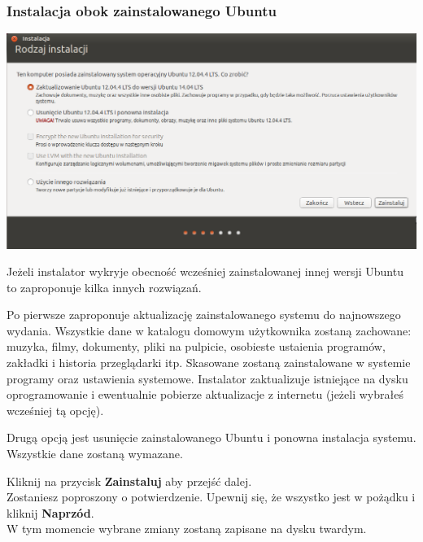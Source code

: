 \subsubsection{Instalacja obok zainstalowanego Ubuntu}
\begin{center}
	\includegraphics[scale=0.5]{images/instalator_partycjonowanie_obok_ubuntu.png}
\end{center}
Jeżeli instalator wykryje obecność wcześniej zainstalowanej innej wersji Ubuntu to zaproponuje kilka innych rozwiązań.

Po pierwsze zaproponuje aktualizację zainstalowanego systemu do najnowszego wydania. Wszystkie dane w katalogu domowym użytkownika zostaną zachowane: muzyka, filmy, dokumenty, pliki na pulpicie, osobieste ustaienia programów, zakładki i historia przeglądarki itp.
Skasowane zostaną zainstalowane w systemie programy oraz ustawienia systemowe. Instalator zaktualizuje istniejące na dysku oprogramowanie i ewentualnie pobierze aktualizacje z internetu (jeżeli wybrałeś wcześniej tą opcję).

Drugą opcją jest usunięcie zainstalowanego Ubuntu i ponowna instalacja systemu. Wszystkie dane zostaną wymazane.
\begin{flushright}
Kliknij na przycisk \textbf{Zainstaluj} aby przejść dalej.\\
Zostaniesz poproszony o potwierdzenie. Upewnij się, że wszystko jest w pożądku i kliknij \textbf{Naprzód}.\\
W tym momencie wybrane zmiany zostaną zapisane na dysku twardym.
\end{flushright}
\clearpage

